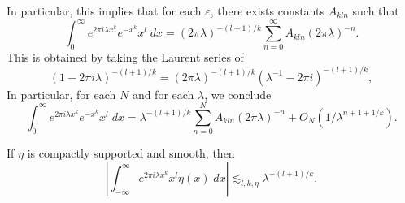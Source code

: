 \begin{remark}
  In particular, this implies that for each $\varepsilon$, there exists constants $A_{kln}$ such that
  \[ \int_0^\infty e^{2 \pi i \lambda x^k} e^{-x^k} x^l\; dx = (2 \pi \lambda)^{-(l+1)/k} \sum_{n = 0}^\infty A_{kln} (2 \pi \lambda)^{-n}. \]
  This is obtained by taking the Laurent series of
  \[ (1 - 2 \pi i \lambda)^{-(l+1)/k} = (2 \pi \lambda)^{-(l+1)/k} (\lambda^{-1} - 2 \pi i)^{-(l+1)/k}, \]
  In particular, for each $N$ and for each $\lambda$, we conclude
  \[ \int_0^\infty e^{2 \pi i \lambda x^k} e^{-x^k} x^l\; dx = \lambda^{-(l+1)/k} \sum_{n = 0}^N A_{kln} (2 \pi \lambda)^{-n} + O_N \left(1/\lambda^{n + 1 + 1/k} \right). \]
\end{remark}

\begin{lemma}
  If $\eta$ is compactly supported and smooth, then
  \[ \left| \int_{-\infty}^\infty e^{2 \pi i \lambda x^k} x^l \eta(x)\; dx \right| \lesssim_{l,k,\eta} \lambda^{-(l + 1)/k}. \]
\end{lemma}
